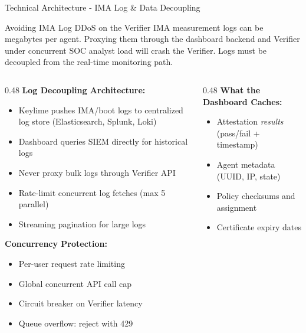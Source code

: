 \begin{frame}{Technical Architecture - IMA Log \& Data Decoupling}
  \begin{block}{Avoiding IMA Log DDoS on the Verifier}
    \scriptsize
    IMA measurement logs can be megabytes per agent. Proxying them through the
    dashboard backend and Verifier under concurrent SOC analyst load will crash the Verifier.
    Logs must be decoupled from the real-time monitoring path.
  \end{block}

  \vspace{0.1cm}

  \scriptsize
  \begin{columns}[T]
    \begin{column}{0.48\textwidth}
      \textbf{Log Decoupling Architecture:}
      \begin{itemize}
        \setlength{\itemsep}{0pt}
        \item Keylime pushes IMA/boot logs to centralized log store (Elasticsearch, Splunk, Loki)
        \item Dashboard queries SIEM directly for historical logs
        \item Never proxy bulk logs through Verifier API
        \item Rate-limit concurrent log fetches (max 5 parallel)
        \item Streaming pagination for large logs
      \end{itemize}

      \vspace{0.1cm}

      \textbf{Concurrency Protection:}
      \begin{itemize}
        \setlength{\itemsep}{0pt}
        \item Per-user request rate limiting
        \item Global concurrent API call cap
        \item Circuit breaker on Verifier latency
        \item Queue overflow: reject with 429
      \end{itemize}
    \end{column}
    \begin{column}{0.48\textwidth}
      \textbf{What the Dashboard Caches:}
      \begin{itemize}
        \setlength{\itemsep}{0pt}
        \item Attestation \textit{results} (pass/fail + timestamp)
        \item Agent metadata (UUID, IP, state)
        \item Policy checksums and assignment
        \item Certificate expiry dates
      \end{itemize}


\end{column}
\end{columns}
\end{frame}

